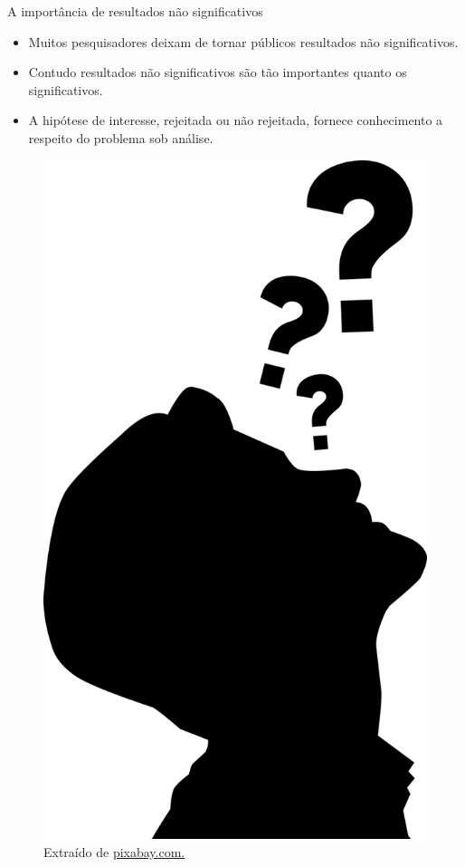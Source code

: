 \documentclass[
  ignorenonframetext,
  serif,
  professionalfont,
  usenames,
  dvipsnames,
  aspectratio = 169]{beamer}
\def\beginAHalfColumn{\begin{minipage}{0.49\textwidth}}%
\def\endColumns{\end{minipage}}%
\begin{document}
\begin{frame}{A importância de resultados não significativos}
\protect\hypertarget{a-importuxe2ncia-de-resultados-nuxe3o-significativos}{}
\beginAHalfColumn

\begin{itemize}
\item
  Muitos pesquisadores deixam de tornar públicos resultados não
  significativos.
\item
  Contudo resultados não significativos são tão importantes quanto os
  significativos.
\item
  A hipótese de interesse, rejeitada ou não rejeitada, fornece
  conhecimento a respeito do problema sob análise.
\end{itemize}

\endColumns
\beginAHalfColumn

\begin{figure}

{\centering \includegraphics[width=0.4\linewidth]{./img/duvida} 

}

\caption{Extraído de \href{https://cdn.pixabay.com/photo/2021/11/04/14/36/doubt-6768418_1280.png}{pixabay.com.}}\label{fig:unnamed-chunk-10}
\end{figure}

\endColumns
\end{frame}
\end{document}
